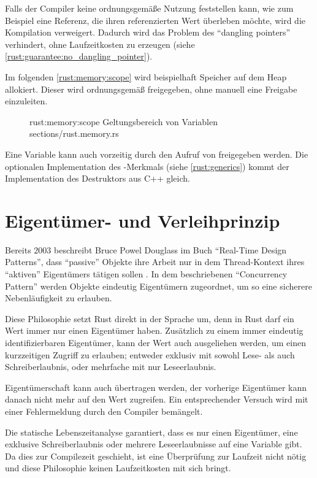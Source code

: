 Falls der Compiler keine ordnungsgemäße Nutzung feststellen kann, wie zum Beispiel eine Referenz, die ihren referenzierten Wert überleben möchte, wird die Kompilation verweigert.
Dadurch wird das Problem des \enquote{dangling pointers} verhindert, ohne Laufzeitkosten zu erzeugen (siehe \autoref{rust:guarantee:no_dangling_pointer}).

Im folgenden \autoref{rust:memory:scope} wird beispielhaft Speicher auf dem Heap allokiert.
Dieser wird ordnungsgemäß freigegeben, ohne manuell eine Freigabe einzuleiten.

\begin{figure}[H]
	\rustcinclude
		{rust:memory:scope}
		{Geltungsbereich von Variablen}
		{sections/rust.memory.rs}
\end{figure}

Eine Variable kann auch vorzeitig durch den Aufruf von  freigegeben werden.
Die optionalen Implementation des -Merkmals (siehe \autoref{rust:generics}) kommt der Implementation des Destruktors aus C++ gleich.

\section{Eigentümer- und Verleihprinzip}
\label{rust:ownership}

Bereits 2003 beschreibt Bruce Powel Douglass im Buch \enquote{Real-Time Design Patterns}, dass \enquote{passive} Objekte ihre Arbeit nur in dem Thread-Kontext ihres \enquote{aktiven} Eigentümers tätigen sollen \cite[204]{douglass2003real}.
In dem beschriebenen \enquote{Concurrency Pattern} werden Objekte eindeutig Eigentümern zugeordnet, um so eine sicherere Nebenläufigkeit zu erlauben.

Diese Philosophie setzt Rust direkt in der Sprache um, denn in Rust darf ein Wert immer nur einen Eigentümer haben.
Zusätzlich zu einem immer eindeutig identifizierbaren Eigentümer, kann der Wert auch ausgeliehen werden, um einen kurzzeitigen Zugriff zu erlauben; entweder exklusiv mit sowohl Lese- als auch Schreiberlaubnis, oder mehrfache mit nur Leseerlaubnis.

Eigentümerschaft kann auch übertragen werden, der vorherige Eigentümer kann danach nicht mehr auf den Wert zugreifen.
Ein entsprechender Versuch wird mit einer Fehlermeldung durch den Compiler bemängelt.

Die statische Lebenszeitanalyse garantiert, dass es nur einen Eigentümer, eine exklusive Schreiberlaubnis oder mehrere Leseerlaubnisse auf eine Variable gibt.
Da dies zur Compilezeit geschieht, ist eine Überprüfung zur Laufzeit nicht nötig und diese Philosophie keinen Laufzeitkosten mit sich bringt.

